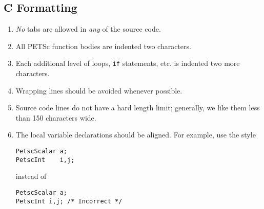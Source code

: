 \subsection{C Formatting}
\begin{enumerate}
\item {\em No} tabs are allowed in {\em any} of the source code.
\item All PETSc function bodies are indented two characters.
\item Each additional level of loops, \lstinline{if} statements, etc. is indented
      two more characters.
\item Wrapping lines should be avoided whenever possible.
\item Source code lines do not have a hard length limit; generally, we like them less than 150 characters wide.
\item The local variable declarations should be aligned. For example,
      use the style 
\begin{lstlisting}
PetscScalar a;
PetscInt    i,j;
\end{lstlisting}
instead of
\begin{lstlisting}
PetscScalar a;
PetscInt i,j; /* Incorrect */
\end{lstlisting}


\end{enumerate}
